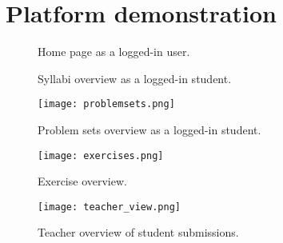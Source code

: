\chapter{Platform demonstration} \label{chap:images}
\begin{figure}[H]
    \centering
    \caption{Home page as a logged-in user.}
    \label{fig:Home page}
\end{figure}

\begin{figure}[H]
    \centering
    \caption{Syllabi overview as a logged-in student.}
    \label{fig:syllabi}
\end{figure}

\begin{figure}[H]
    \centering
    \texttt{[image: problemsets.png]}
    \caption{Problem sets overview as a logged-in student.}
    \label{fig:problemsets}
\end{figure}

\begin{figure}[H]
    \centering
    \texttt{[image: exercises.png]}
    \caption{Exercise overview.}
    \label{fig:exercise_overview}
\end{figure}

\begin{figure}[H]
    \centering
    \texttt{[image: teacher\_view.png]}
    \caption{Teacher overview of student submissions.}
    \label{fig:teacher_overview.}
\end{figure}